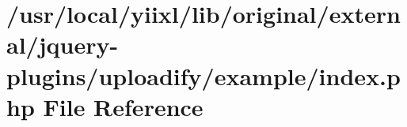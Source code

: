 \hypertarget{external_2jquery-plugins_2uploadify_2example_2index_8php}{
\section{/usr/local/yiixl/lib/original/external/jquery-\/plugins/uploadify/example/index.php File Reference}
\label{external_2jquery-plugins_2uploadify_2example_2index_8php}
}
